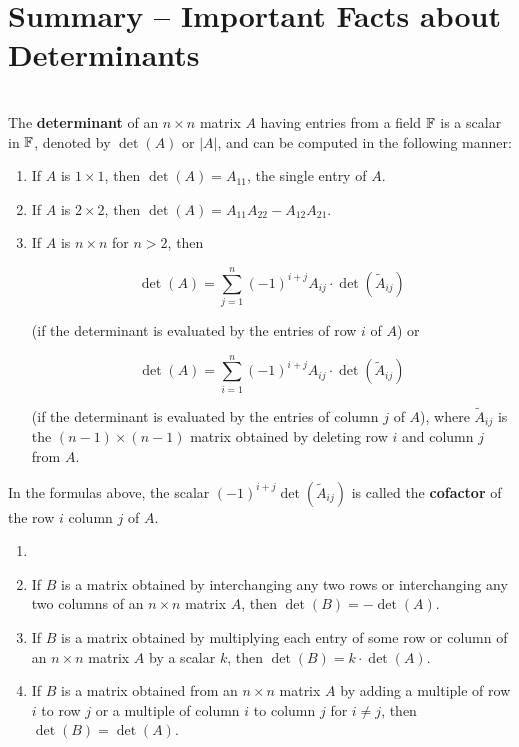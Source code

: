 \section{Summary -- Important Facts about Determinants}

\begin{definition}
	\hfill\\
	The \textbf{determinant} of an $n \times n$ matrix $A$ having entries from a field $\mathbb{F}$ is a scalar in $\mathbb{F}$, denoted by $\det(A)$ or $|A|$, and can be computed in the following manner:
	
	\begin{enumerate}
		\item If $A$ is $1 \times 1$, then $\det(A) = A_{11}$, the single entry of $A$.
		\item If $A$ is $2 \times 2$, then $\det(A) = A_{11}A_{22} - A_{12}A_{21}$.
		\item If $A$ is $n \times n$ for $n > 2$, then
		
		\[\det(A) = \sum_{j=1}^{n}(-1)^{i+j}A_{ij}\cdot\det(\tilde{A}_{ij})\]
		
		(if the determinant is evaluated by the entries of row $i$ of $A$) or
		
		\[\det(A) = \sum_{i=1}^{n}(-1)^{i+j}A_{ij}\cdot\det(\tilde{A}_{ij})\]
		
		(if the determinant is evaluated by the entries of column $j$ of $A$), where $\tilde{A}_{ij}$ is the $(n-1) \times (n-1)$ matrix obtained by deleting row $i$ and column $j$ from $A$.
	\end{enumerate}
	
	In the formulas above, the scalar $(-1)^{i+j}\det(\tilde{A}_{ij})$ is called the \textbf{cofactor} of the row $i$ column $j$ of $A$.
\end{definition}

\begin{definition}
	\begin{enumerate}
		\item[]
		\item If $B$ is a matrix obtained by interchanging any two rows or interchanging any two columns of an $n \times n$ matrix $A$, then $\det(B) = -\det(A)$.
		\item If $B$ is a matrix obtained by multiplying each entry of some row or column of an $n \times n$ matrix $A$ by a scalar $k$, then $\det(B) = k\cdot\det(A)$.
		\item If $B$ is a matrix obtained from an $n \times n$ matrix $A$ by adding a multiple of row $i$ to row $j$ or a multiple of column $i$ to column $j$ for $i \neq j$, then $\det(B) = \det(A)$.
	\end{enumerate}
\end{definition}